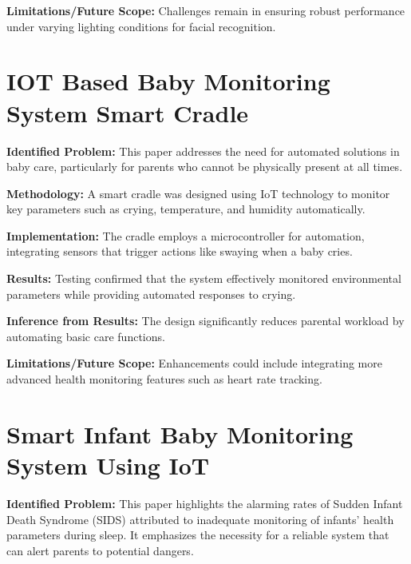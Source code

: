 \documentclass[12pt,a4paper]{report}
\begin{document}
\setlength{\parskip}{1em}  %

\noindent\textbf{Limitations/Future Scope:} Challenges remain in ensuring robust performance under varying lighting conditions for facial recognition.
\setlength{\parskip}{1em}  %


\section{IOT Based Baby Monitoring System Smart Cradle}
\textbf{Identified Problem: }This paper addresses the need for automated solutions in baby care, particularly for parents who cannot be physically present at all times\cite{9442022}.

\setlength{\parskip}{1em}  %


\noindent\textbf{Methodology:} A smart cradle was designed using IoT technology to monitor key parameters such as crying, temperature, and humidity automatically.

\setlength{\parskip}{1em}  %


\noindent\textbf{Implementation:}  The cradle employs a microcontroller for automation, integrating sensors that trigger actions like swaying when a baby cries.
\setlength{\parskip}{1em}  %

\noindent\textbf{Results:} Testing confirmed that the system effectively monitored environmental parameters while providing automated responses to crying.

\setlength{\parskip}{1em}  %


\noindent\textbf{Inference from Results:} The design significantly reduces parental workload by automating basic care functions.


\setlength{\parskip}{1em}  %

\noindent\textbf{Limitations/Future Scope:} Enhancements could include integrating more advanced health monitoring features such as heart rate tracking.
\setlength{\parskip}{1em}  %



\section{Smart Infant Baby Monitoring System Using IoT}
\textbf{Identified Problem:} This paper highlights the alarming rates of Sudden Infant Death Syndrome (SIDS) attributed to inadequate monitoring of infants' health parameters during sleep. It emphasizes the necessity for a reliable system that can alert parents to potential dangers\cite{Kumar2023}.
\end{document}
